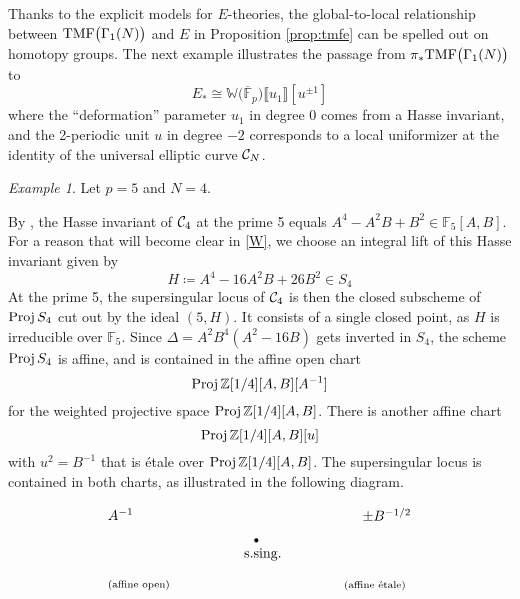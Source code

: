 \documentclass{gtpart}
\theoremstyle{definition}
\theoremstyle{remark}
\newtheorem{ex}[thm]{Example}
\newcommand{\mb}[1]{\mathbb{#1}}
\newcommand{\Proj}{{\rm Proj\thinspace}}
\newcommand{\cF}{\overline {\mb F}}
\newcommand{\CC}{{\cal C}}
\newcommand{\BF}{{\mb F}}
\newcommand{\BW}{{\mb W}}
\newcommand{\BZ}{{\mb Z}}
\newcommand{\TMF}{{\rm TMF}}
\renewcommand{\D}{\Delta}
\newcommand{\G}{\Gamma}
\newcommand{\ce}{\coloneqq}
\newcommand{\lb}{\llbracket}
\newcommand{\rb}{\rrbracket}
\renewcommand{\=}{\approx}
\renewcommand{\-}{\sim}
\numberwithin{equation}{section}
\numberwithin{thm}{section}
\begin{document}
Thanks to the explicit models for $E$-theories, the global-to-local relationship between $\TMF\big(\G_1(N)\big)$ and $E$ in Proposition \ref{prop:tmfe} can be spelled out on homotopy groups.  
The next example illustrates the passage from $\pi_* \TMF\big(\G_1(N)\big)$ to 
\[
 E_* \cong \BW \big( \cF_p \big) \lb u_1 \rb [u^{\pm 1}] 
\]
where the ``deformation'' parameter $u_1$ in degree 0 comes from a Hasse invariant, 
and the 2-periodic unit $u$ in degree $-2$ corresponds to a local uniformizer at the identity of the universal elliptic curve $\CC_N$.  
\begin{ex}
 \label{ex:mfe0}
 Let $p = 5$ and $N = 4$.  

 By \cite[V.4.1a]{AEC}, the Hasse invariant of $\CC_4$ at the prime 5 equals $A^4 - A^2 B + B^2 \in \BF_5[A, B]$.  
 For a reason that will become clear in \eqref{W}, we choose an integral lift of this Hasse invariant given by 
 \[
  H \ce A^4 - 16 A^2 B + 26 B^2 \in S_4 
 \]
 At the prime 5, the supersingular locus of $\CC_4$ is then the closed subscheme of $\Proj S_4$ cut out by the ideal $(5, H)$.  
 It consists of a single closed point, as $H$ is irreducible over $\BF_5$.  
 Since $\D = A^2 B^4 (A^2 - 16 B)$ gets inverted in $S_4$, the scheme $\Proj S_4$ is affine, 
 and is contained in the affine open chart 
 \[
  \Proj \BZ[1/4] [A, B] [A^{-1}] 
 \]
 for the weighted projective space $\Proj \BZ[1/4] [A, B]$.  
 There is another affine chart 
 \[
  \Proj \BZ[1/4] [A, B] [u] 
 \]
 with $u^2 = B^{-1}$ that is \'etale over $\Proj \BZ[1/4] [A, B]$.  
 The supersingular locus is contained in both charts, as illustrated in the following diagram.   
\\
 \begin{equation*}
  \label{chart}
  \begin{tikzpicture}[baseline=(current bounding box.center), every fit/.style={ellipse,draw,inner sep=0pt}, mytext/.style={inner sep=6pt}]
          \node[mytext,align=left,rectangle] (a) at (0, 0) {$A^{-1}$ \\ \\ \\ \\ $\scriptstyle \text{(affine open)}$}; 
          \node[mytext,align=left,rectangle] (b) at (6, 0) {$\quad~ \pm B^{-1/2}$ \\ \\ \\ \\ $\scriptstyle \text{(affine \'etale)}$}; 
          \node[mytext,align=left,rectangle] (c) at (3, 0) {$\quad~ _\bullet$ \\ ~ s.sing.}; 

\end{tikzpicture}
\end{equation*}
\end{ex}
\end{document}
